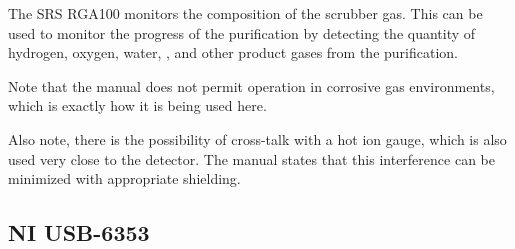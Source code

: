 The SRS RGA100 monitors the composition of the scrubber gas. This can
be used to monitor the progress of the purification by detecting the
quantity of hydrogen,
oxygen, water, , and other product gases from the purification. \par

Note that the manual does not permit operation in corrosive gas environments,
which is exactly how it is being used here. \par

Also note, there is the possibility of cross-talk with a hot ion
gauge, which is also used very close to the detector. The manual
states that this interference can be minimized with appropriate shielding.

\subsection{NI USB-6353}



\pagebreak
